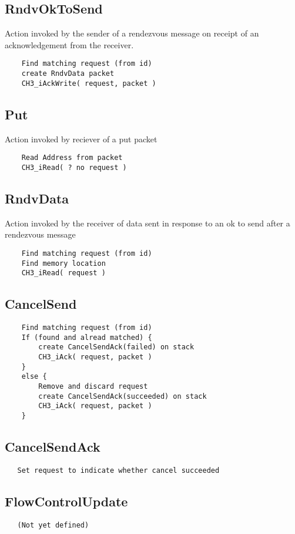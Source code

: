 \documentclass{article}
\begin{document}
\subsection{RndvOkToSend}
Action invoked by the sender of a rendezvous message on receipt of an
acknowledgement from the receiver.
\begin{verbatim}
    Find matching request (from id)
    create RndvData packet
    CH3_iAckWrite( request, packet )
\end{verbatim}

\subsection{Put}
Action invoked by reciever of a put packet
\begin{verbatim}
    Read Address from packet
    CH3_iRead( ? no request )
\end{verbatim}

\subsection{RndvData}
Action invoked by the receiver of data sent in response to an ok to send after
a rendezvous message
\begin{verbatim}
    Find matching request (from id)
    Find memory location
    CH3_iRead( request )
\end{verbatim}

\subsection{CancelSend}
\begin{verbatim}
    Find matching request (from id)
    If (found and alread matched) {
        create CancelSendAck(failed) on stack
        CH3_iAck( request, packet )
    }
    else {
        Remove and discard request
        create CancelSendAck(succeeded) on stack
        CH3_iAck( request, packet )
    }
 \end{verbatim}

\subsection{CancelSendAck}
\begin{verbatim}
   Set request to indicate whether cancel succeeded
\end{verbatim}

\subsection{FlowControlUpdate}
\begin{verbatim}
   (Not yet defined)
\end{verbatim}
\end{document}
